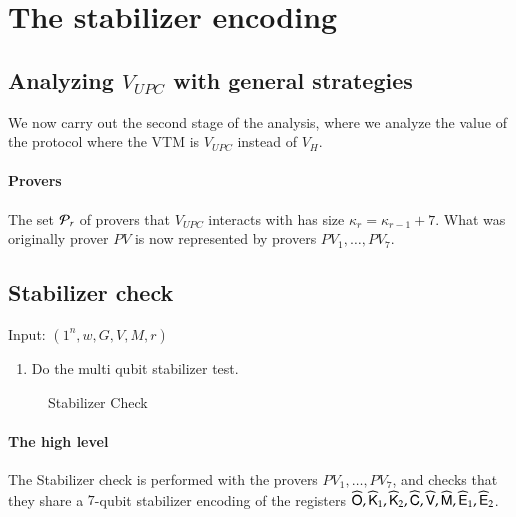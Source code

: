 \section{The stabilizer encoding}
\label{sec:stabilizer}



\subsection{Analyzing $V_{UPC}$ with general strategies}

We now carry out the second stage of the analysis, where we analyze the value of the protocol where the VTM is $V_{UPC}$ instead of $V_H$. 

\paragraph{Provers} The set $\mathcal P_r$ of provers that $V_{UPC}$ interacts with has size $\kappa_r = \kappa_{r-1} + 7$. What was originally prover $PV$ is now represented by provers $PV_1,\ldots,PV_7$. 

\subsection{Stabilizer check}

\begin{center}
\begin{mdframed}
    Input: $(1^n,w,G,V,M,r)$ \\
	\begin{enumerate}
		\item Do the multi qubit stabilizer test.
	\end{enumerate}    
\end{mdframed}
\end{center}
\begin{figure}[H]
\caption{Stabilizer Check}
\label{fig:stabilizer_check}
\end{figure}

\paragraph{The high level} The Stabilizer check is performed with the provers $PV_1,\ldots,PV_7$, and checks that they share a $7$-qubit stabilizer encoding of the registers $\widehat{{\mathsf{O}}}, \widehat{{\mathsf{K}}}_1,\widehat{{\mathsf{K}}}_2, \widehat{{\mathsf{C}}}, \widehat{{\mathsf{V}}}, \widehat{{\mathsf{M}}}, \widehat{{\mathsf{E}}}_1, \widehat{{\mathsf{E}}}_2$. 


